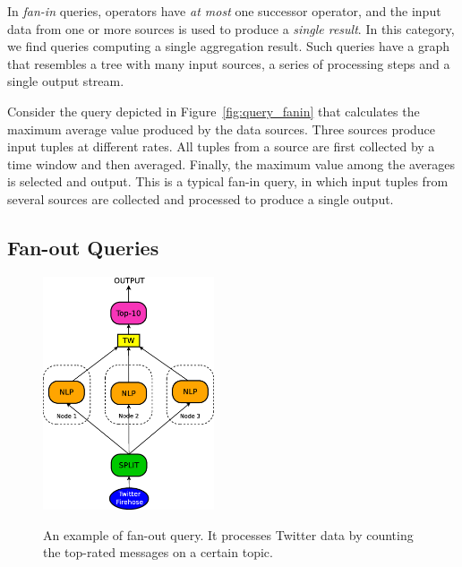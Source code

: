 In \emph{fan-in} queries, operators have \textit{at most} one successor operator, and the input data from
one or more sources is used to produce a \textit{single result}.
In this category, we find queries computing a single aggregation result.
Such queries have a graph that resembles a tree with many input sources, a series of
processing steps and a single output stream.

\ex Consider the query depicted in Figure~\ref{fig:query_fanin} that calculates
the maximum average value produced by the data sources.
Three sources produce input tuples at different rates. All tuples from a source are first
collected by a time window and then averaged. Finally, the maximum value among the
averages is selected and output. This is a typical fan-in query, in which input tuples from several
sources are collected and processed to produce a single output.

\subsection*{Fan-out Queries} 
\label{sec:fan-out}

\DIFdelbegin %
\DIFdelendFL \DIFaddbeginFL \begin{figure}[t]
	\DIFaddendFL \centering
	\includegraphics[width=0.45\textwidth]{img/tesi/fan-out_mr_senza} 
	\caption{An example of fan-out query. It processes Twitter data by counting the top-rated messages on a
	certain topic.}
	\DIFdelbeginFL %
\DIFdelendFL \DIFaddbeginFL \label{fig:fanout_mr2}
\DIFaddendFL \end{figure}

